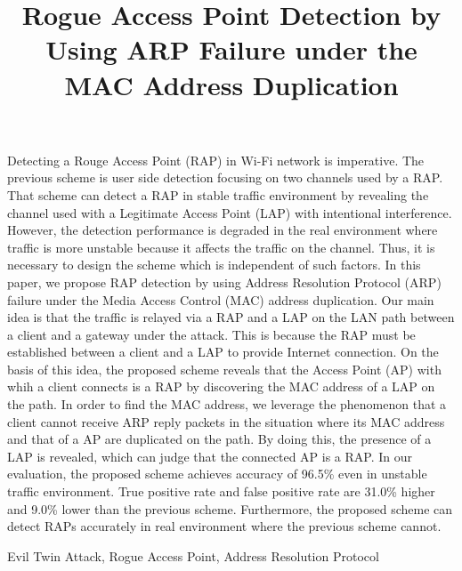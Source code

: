 \documentclass[paper]{ieice}
\title{Rogue Access Point Detection by Using ARP Failure under the MAC Address Duplication}
\begin{document}
\maketitle
\begin{summary}
Detecting a Rouge Access Point (RAP) in Wi-Fi network is imperative.
The previous scheme is user side detection focusing on two channels used by a RAP.
That scheme can detect a RAP in stable traffic environment by revealing the channel used with a Legitimate Access Point (LAP) with intentional interference.
However, the detection performance is degraded in the real environment where traffic is more unstable because it affects the traffic on the channel.
Thus, it is necessary to design the scheme which is independent of such factors.
In this paper, we propose RAP detection by using Address Resolution Protocol (ARP) failure under the Media Access Control (MAC) address duplication.
Our main idea is that the traffic is relayed via a RAP and a LAP on the LAN path between a client and a gateway under the attack.
This is because the RAP must be established between a client and a LAP to provide Internet connection.
On the basis of this idea, the proposed scheme reveals that the Access Point (AP) with whih a client connects is a RAP by discovering the MAC address of a LAP on the path.
In order to find the MAC address, we leverage the phenomenon that a client cannot receive ARP reply packets in the situation where its MAC address and that of a AP are duplicated on the path.
By doing this, the presence of a LAP is revealed, which can judge that the connected AP is a RAP.
In our evaluation, the proposed scheme achieves accuracy of 96.5\% even in unstable traffic environment.
True positive rate and false positive rate are 31.0\% higher and 9.0\% lower than the previous scheme.
Furthermore, the proposed scheme can detect RAPs accurately in real environment where the previous scheme cannot.
\end{summary}
\begin{keywords}
Evil Twin Attack, Rogue Access Point, Address Resolution Protocol
\end{keywords}
\end{document}
